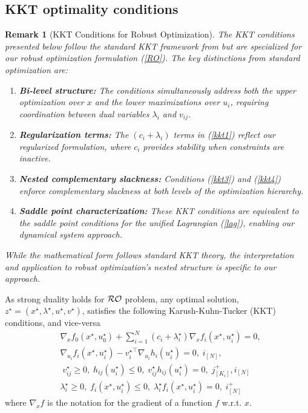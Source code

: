 \documentclass[journal,twoside,web]{ieeecolor}
\newtheorem{remark}{Remark}
\begin{document}
\subsection{KKT optimality conditions}

{\color{blue} \begin{remark}[KKT Conditions for Robust Optimization]
The KKT conditions presented below follow the standard KKT framework from \cite{boyd2004} but are specialized for our robust optimization formulation (\ref{RO}). The key distinctions from standard optimization are:

\begin{enumerate}
\item \textbf{Bi-level structure:} The conditions simultaneously address both the upper optimization over $x$ and the lower maximizations over $u_i$, requiring coordination between dual variables $\lambda_i$ and $v_{ij}$.

\item \textbf{Regularization terms:} The $(c_i + \lambda_i)$ terms in (\ref{kkt1}) reflect our regularized formulation, where $c_i$ provides stability when constraints are inactive.

\item \textbf{Nested complementary slackness:} Conditions (\ref{kkt3}) and (\ref{kkt4}) enforce complementary slackness at both levels of the optimization hierarchy.

\item \textbf{Saddle point characterization:} These KKT conditions are equivalent to the saddle point conditions for the unified Lagrangian (\ref{lag}), enabling our dynamical system approach.
\end{enumerate}

While the mathematical form follows standard KKT theory, the interpretation and application to robust optimization's nested structure is specific to our approach.
\end{remark}}

As strong duality holds for ${\cal RO}$ problem, any optimal solution, $z^\star=(x^\star,\lambda^\star,u^\star,v^\star)$, satisfies the following Karush-Kuhn-Tucker (KKT) conditions, and vice-versa \cite{boyd2004}
\begin{align}
&\nabla_x f_0(x^\star,u_0^\star)+  \sum_{i=1}^N(c_i+\lambda^\star_i) \nabla_x f_i(x^\star,u_i^\star)=0,\label{kkt1}\\
&\nabla_{u_i} f_i(x^\star,u_i^\star)-{v_i^\star}^\top \nabla_{u_i} h_i(u_i^\star)=0,\; i_ {[N]},\label{kkt2}\\
&\;v_{ij}^\star\geq 0,\; h_{ij}(u_i^\star)\leq 0,\;v_{ij}^\star h_{ij}(u_i^\star)=0,\;  j^+_{[K_i]}, i_{[N]} \label{kkt3}\\
&\lambda_i^\star\geq 0,\;f_{i}(x^\star,u_i^\star)\leq 0,\;\lambda_i^\star f_{i}(x^\star,u_i^\star)=0,\;i^+_{[N]} \label{kkt4}
\end{align}
where $\nabla_x f$ is the notation for the gradient of a function $f$ w.r.t. $x$.
\end{document}
